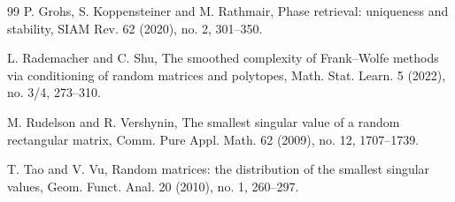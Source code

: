 \documentclass[preprint,12pt]{elsarticle}
\begin{document}
\begin{thebibliography}{99}
P. Grohs, S. Koppensteiner and M. Rathmair, Phase retrieval: uniqueness and stability, SIAM Rev. 62
(2020), no. 2, 301--350.

L. Rademacher and C. Shu, The smoothed complexity of Frank--Wolfe methods via conditioning of random
matrices and polytopes, Math. Stat. Learn. 5 (2022), no. 3/4, 273--310.

M. Rudelson and R. Vershynin, The smallest singular value of a random rectangular matrix, Comm. Pure
Appl. Math. 62 (2009), no. 12, 1707--1739.



T. Tao and V. Vu, Random matrices: the distribution of the smallest singular values, Geom. Funct.
Anal. 20 (2010), no. 1, 260--297.

\end{thebibliography}
\end{document}
